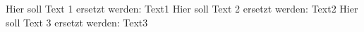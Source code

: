 \documentclass{article}
\begin{document}
    Hier soll Text 1 ersetzt werden: Text1
    Hier soll Text 2 ersetzt werden: Text2
    Hier soll Text 3 ersetzt werden: Text3
\end{document}
